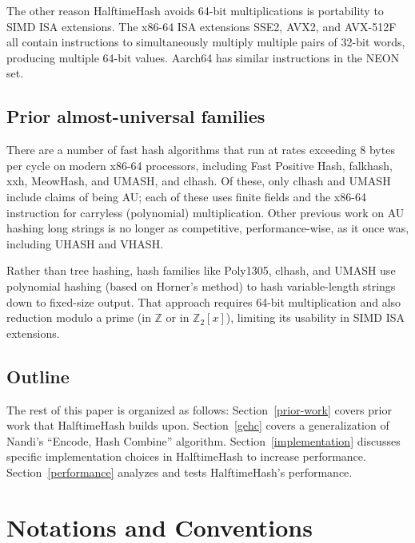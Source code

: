 \documentclass[runningheads]{llncs}
\newcommand{\ints}{\mathbb{Z}}
\begin{document}

The other reason HalftimeHash avoids 64-bit multiplications is portability to SIMD ISA extensions.
The x86-64 ISA extensions SSE2, AVX2, and AVX-512F all contain instructions to simultaneously multiply multiple pairs of 32-bit words, producing multiple 64-bit values.
Aarch64 has similar instructions in the NEON set.

\subsection{Prior almost-universal families}

There are a number of fast hash algorithms that run at rates exceeding 8 bytes per cycle on modern x86-64 processors, including Fast Positive Hash, falk\-hash, xxh, Meow\-Hash, and UMASH, and cl\-hash. \cite{smhasher}
Of these, only cl\-hash and U\-MASH include claims of being AU; each of these uses finite fields and the x86-64 instruction for carryless (polynomial) multiplication.
Other previous work on AU hashing long strings is no longer as competitive, performance-wise, as it once was, including UHASH and VHASH. \cite{clhash,umac,vmac}

Rather than tree hashing, hash families like Poly1305, clhash, and UMASH use polynomial hashing (based on Horner's method) to hash variable-length strings down to fixed-size output.
That approach requires 64-bit multiplication and also reduction modulo a prime (in $\ints$ or in $\ints_2[x]$), limiting its usability in SIMD ISA extensions.



\subsection{Outline}

The rest of this paper is organized as follows: Section~\ref{prior-work} covers prior work that HalftimeHash builds upon.
Section~\ref{gehc} covers a generalization of Nandi's ``Encode, Hash Combine'' algorithm.\cite{ehc-nandi}
Section~\ref{implementation} discusses specific implementation choices in HalftimeHash to increase performance.
Section~\ref{performance} analyzes and tests HalftimeHash's performance.

\section{Notations and Conventions}
\end{document}
